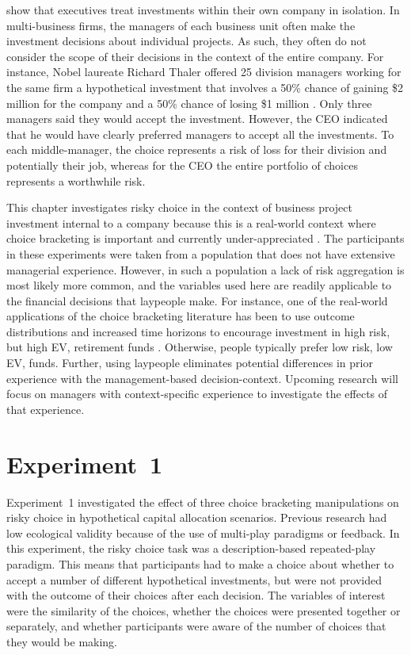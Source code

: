\documentclass[a4paper, nobind, dvipsnames]{templates/ociamthesis}
\theoremstyle{definition}
\theoremstyle{definition}
\theoremstyle{definition}
\theoremstyle{definition}
\theoremstyle{remark}
\begin{document}
\textcite{lovallo2020} show that executives treat investments within their own company in
isolation. In multi-business firms, the managers of each business unit often
make the investment decisions about individual projects. As such, they often do
not consider the scope of their decisions in the context of the entire company.
For instance, Nobel laureate Richard Thaler offered 25 division managers working
for the same firm a hypothetical investment that involves a 50\% chance of
gaining \$2 million for the company and a 50\% chance of losing \$1 million
\autocite*{thaler1999}. Only three managers said they would accept the investment.
However, the CEO indicated that he would have clearly preferred managers to
accept all the investments. To each middle-manager, the choice represents a risk
of loss for their division and potentially their job, whereas for the CEO the
entire portfolio of choices represents a worthwhile risk.

This chapter investigates risky choice in the context of business project
investment internal to a company because this is a real-world context where
choice bracketing is important and currently under-appreciated \autocite{lovallo2020}.
The participants in these experiments were taken from a population that does not
have extensive managerial experience. However, in such a population a lack of
risk aggregation is most likely more common, and the variables used here are
readily applicable to the financial decisions that laypeople make. For instance,
one of the real-world applications of the choice bracketing literature has been
to use outcome distributions and increased time horizons to encourage investment
in high risk, but high EV, retirement funds \autocite[e.g.,][]{benartzi1999}. Otherwise,
people typically prefer low risk, low EV, funds. Further, using laypeople
eliminates potential differences in prior experience with the management-based
decision-context. Upcoming research will focus on managers with context-specific
experience to investigate the effects of that experience.

\hypertarget{aggregation-1}{%
\section{Experiment~1}\label{aggregation-1}}

Experiment~1 investigated the effect of three choice bracketing manipulations on
risky choice in hypothetical capital allocation scenarios. Previous research
had low ecological validity because of the use of multi-play paradigms or
feedback. In this experiment, the risky choice task was a description-based
repeated-play paradigm. This means that participants had to make a choice about
whether to accept a number of different hypothetical investments, but were not
provided with the outcome of their choices after each decision. The variables of
interest were the similarity of the choices, whether the choices were presented
together or separately, and whether participants were aware of the number of
choices that they would be making.
\end{document}
